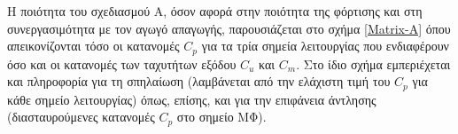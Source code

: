 Η ποιότητα του σχεδιασμού Α, όσον αφορά στην ποιότητα της φόρτισης και στη συνεργασιμότητα με τον αγωγό απαγωγής, παρουσιάζεται στο σχήμα \ref{Matrix-A} όπου απεικονίζονται τόσο οι κατανομές $C_p$ για τα τρία σημεία λειτουργίας που ενδιαφέρουν όσο και οι κατανομές των ταχυτήτων εξόδου $C_u$ και $C_m$. Στο ίδιο σχήμα εμπεριέχεται και πληροφορία για τη σπηλαίωση (λαμβάνεται από την ελάχιστη τιμή του $C_p$ για κάθε σημείο λειτουργίας) όπως, επίσης, και για την επιφάνεια άντλησης (διασταυρούμενες κατανομές $C_p$ στο σημείο ΜΦ).      

\begin{figure}[h!]
\begin{minipage}[b]{0.5\linewidth}
 \centering
\end{minipage}
\begin{minipage}[b]{0.5\linewidth}
 \centering

\end{minipage}
\end{figure}

